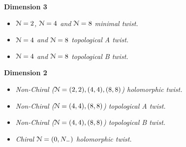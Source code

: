 \documentclass[10pt, oneside]{article}
\begin{document}
\textbf{Dimension 3}
\begin{itemize}
 \item \emph{$\mathcal{N}=2$, $\mathcal{N}=4$ and $\mathcal{N}=8$ minimal twist.} 
 \item \emph{$\mathcal{N}=4$ and $\mathcal{N}=8$ topological A twist.} \cite{BlauThompson1, KapustinVyas}
 \item \emph{$\mathcal{N}=4$ and $\mathcal{N}=8$ topological B twist.} \cite{BlauThompson2, RozanskyWitten} 
\end{itemize}

\textbf{Dimension 2}
\begin{itemize}
 \item \emph{Non-Chiral ($\mathcal{N}=(2,2), (4,4), (8,8)$) holomorphic twist.}
 \item \emph{Non-Chiral ($\mathcal{N}=(4,4), (8,8)$) topological A twist.}
 \item \emph{Non-Chiral ($\mathcal{N}=(4,4), (8,8)$) topological B twist.}
 \item \emph{Chiral $\mathcal{N}=(0,N_-)$ holomorphic twist.}
\end{itemize}
\end{document}

